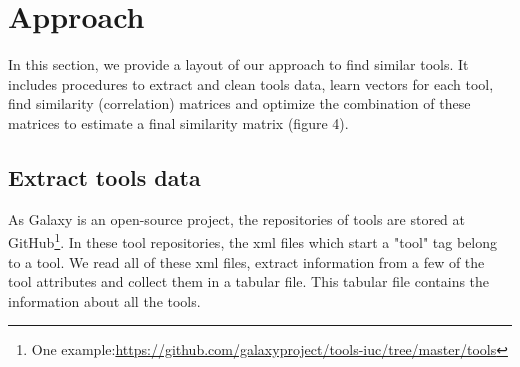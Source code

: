 \chapter{Approach}\label{chap:approach}
In this section, we provide a layout of our approach to find similar tools. It includes procedures to extract and clean tools data, learn vectors for each tool, find similarity (correlation) matrices and optimize the combination of these matrices to estimate a final similarity matrix (figure 4). 
\section{Extract tools data}    
As Galaxy is an open-source project, the repositories of tools are stored at GitHub\footnote{One example:\url{https://github.com/galaxyproject/tools-iuc/tree/master/tools}}. In these tool repositories, the xml files which start a "tool" tag belong to a tool. We read all of these xml files, extract information from a few of the tool attributes and collect them in a tabular file. This tabular file contains the information about all the tools.

